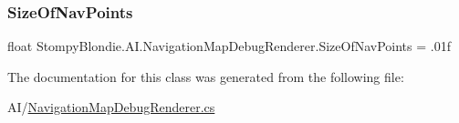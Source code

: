 \subsubsection{\texorpdfstring{Size\+Of\+Nav\+Points}{SizeOfNavPoints}}
{\footnotesize\ttfamily float Stompy\+Blondie.\+A\+I.\+Navigation\+Map\+Debug\+Renderer.\+Size\+Of\+Nav\+Points = .\+01f}



The documentation for this class was generated from the following file\+:\begin{DoxyCompactItemize}
\item 
A\+I/\mbox{\hyperlink{_navigation_map_debug_renderer_8cs}{Navigation\+Map\+Debug\+Renderer.\+cs}}\end{DoxyCompactItemize}
